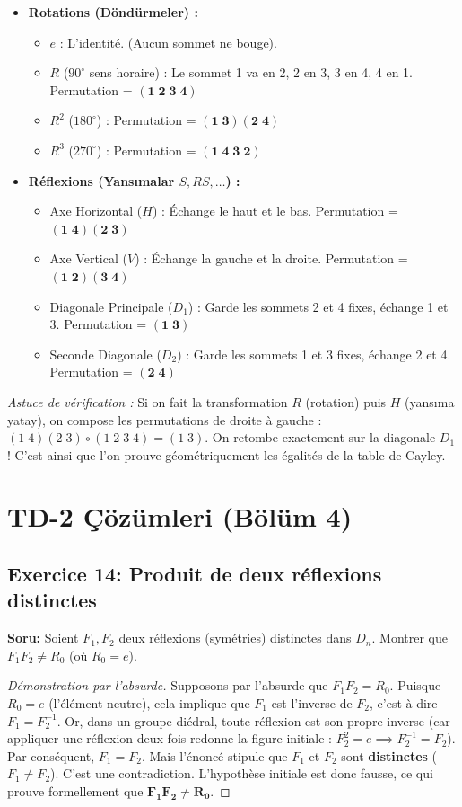 \documentclass[12pt,a4paper]{report}
\begin{document}
\begin{itemize}
    \item \textbf{Rotations (Döndürmeler) :}
    \begin{itemize}
        \item $e$ : L'identité. (Aucun sommet ne bouge).
        \item $R$ ($90^\circ$ sens horaire) : Le sommet 1 va en 2, 2 en 3, 3 en 4, 4 en 1. Permutation = $\mathbf{(1\;2\;3\;4)}$
        \item $R^2$ ($180^\circ$) : Permutation = $\mathbf{(1\;3)(2\;4)}$
        \item $R^3$ ($270^\circ$) : Permutation = $\mathbf{(1\;4\;3\;2)}$
    \end{itemize}
    
    \item \textbf{Réflexions (Yansımalar $S, RS, \dots$) :}
    \begin{itemize}
        \item Axe Horizontal ($H$) : Échange le haut et le bas. Permutation = $\mathbf{(1\;4)(2\;3)}$
        \item Axe Vertical ($V$) : Échange la gauche et la droite. Permutation = $\mathbf{(1\;2)(3\;4)}$
        \item Diagonale Principale ($D_1$) : Garde les sommets 2 et 4 fixes, échange 1 et 3. Permutation = $\mathbf{(1\;3)}$
        \item Seconde Diagonale ($D_2$) : Garde les sommets 1 et 3 fixes, échange 2 et 4. Permutation = $\mathbf{(2\;4)}$
    \end{itemize}
\end{itemize}
\textit{Astuce de vérification :} Si on fait la transformation $R$ (rotation) puis $H$ (yansıma yatay), on compose les permutations de droite à gauche : $(1\;4)(2\;3) \circ (1\;2\;3\;4) = (1\;3)$. On retombe exactement sur la diagonale $D_1$ ! C'est ainsi que l'on prouve géométriquement les égalités de la table de Cayley.

\section{TD-2 Çözümleri (Bölüm 4)}

\subsection*{Exercice 14: Produit de deux réflexions distinctes}
\textbf{Soru:} Soient $F_1, F_2$ deux réflexions (symétries) distinctes dans $D_n$. Montrer que $F_1 F_2 \neq R_0$ (où $R_0 = e$).
\begin{proof}[Démonstration par l'absurde]
Supposons par l'absurde que $F_1 F_2 = R_0$. 
Puisque $R_0 = e$ (l'élément neutre), cela implique que $F_1$ est l'inverse de $F_2$, c'est-à-dire $F_1 = F_2^{-1}$.
Or, dans un groupe diédral, toute réflexion est son propre inverse (car appliquer une réflexion deux fois redonne la figure initiale : $F_2^2 = e \implies F_2^{-1} = F_2$).
Par conséquent, $F_1 = F_2$.
Mais l'énoncé stipule que $F_1$ et $F_2$ sont \textbf{distinctes} ($F_1 \neq F_2$). C'est une contradiction.
L'hypothèse initiale est donc fausse, ce qui prouve formellement que $\mathbf{F_1 F_2 \neq R_0}$.
\end{proof}
\end{document}
